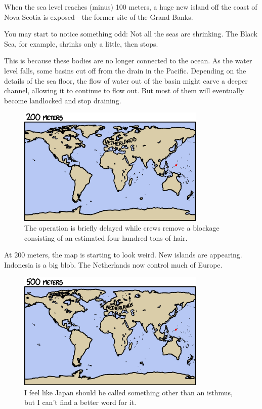 {{When the sea level reaches (minus) 100 meters, a huge new island off the coast of Nova Scotia is exposed—the former site of the Grand Banks.}

{You may start to notice something odd: Not all the seas are shrinking. The Black Sea, for example, shrinks only a little, then stops.}

{This is because these bodies are no longer connected to the ocean. As the water level falls, some basins cut off from the drain in the Pacific. Depending on the details of the sea floor, the flow of water out of the basin might carve a deeper channel, allowing it to continue to flow out. But most of them will eventually become landlocked and stop draining.}

\begin{figure}[!htbp]
\centering
\includegraphics[scale=0.5, max width=0.8\textwidth]{imgs/a/53/drain_200m.png}
\caption{The operation is briefly delayed while crews remove a blockage consisting of an estimated four hundred tons of hair.}
\end{figure}

{At 200 meters, the map is starting to look weird. New islands are appearing. Indonesia is a big blob. The Netherlands now control much of Europe.}

\begin{figure}[!htbp]
\centering
\includegraphics[scale=0.5, max width=0.8\textwidth]{imgs/a/53/drain_500m.png}
\caption{I feel like Japan should be called something other than an isthmus, but I can't find a better word for it.}
\end{figure}

}
